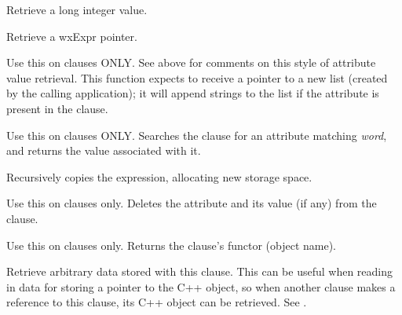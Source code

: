 
Retrieve a long integer value.


Retrieve a wxExpr pointer.

\label{wxexprgetattributestringlist}


Use this on clauses ONLY. See above for comments on this style of
attribute value retrieval. This function expects to receive a pointer to
a new list (created by the calling application); it will append strings
to the list if the attribute is present in the clause.

\label{wxexprattributevalue}


Use this on clauses ONLY. Searches the clause for an attribute
matching {\it word}, and returns the value associated with it.

\label{wxexprcopy}


Recursively copies the expression, allocating new storage space.

\label{wxexprdeletattributevalue}


Use this on clauses only. Deletes the attribute and its value (if any) from the
clause.

\label{wxexprfunctor}


Use this on clauses only. Returns the clause's functor (object name).

\label{wxexprgetclientdata}


Retrieve arbitrary data stored with this clause. This can be useful when
reading in data for storing a pointer to the C++ object, so when another
clause makes a reference to this clause, its C++ object can be retrieved.
See .

